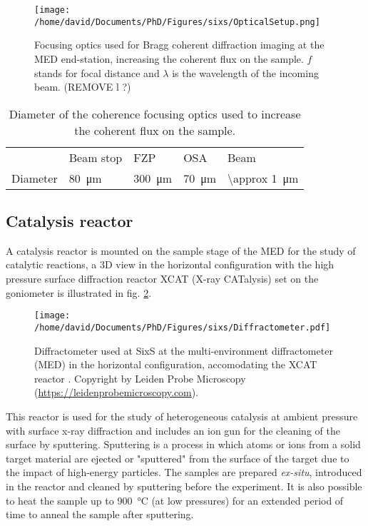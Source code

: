 \begin{figure}[!htb]
    \centering
    \texttt{[image: /home/david/Documents/PhD/Figures/sixs/OpticalSetup.png]}
    \caption{
    	Focusing optics used for Bragg coherent diffraction imaging at the MED end-station, increasing the coherent flux on the sample.
        $f$ stands for focal distance and $\lambda$ is the wavelength of the incoming beam. (REMOVE l ?)
    }
    \label{fig:OpticalSetup}
\end{figure}

\begin{table}[!htb]
    \centering
	\begin{tabular}{l|l|l|l|l}
	     & Beam stop & FZP & OSA & Beam\\ \hfill
	    Diameter & \qty{80}{\um} & \qty{300}{\um} & \qty{70}{\um} & \qty{\approx 1}{\um}\\
	\end{tabular}
	\caption{
	Diameter of the coherence focusing optics used to increase the coherent flux on the sample.
	}
    \label{tab:OpticsBCDI}
\end{table}

\subsection{Catalysis reactor}

A catalysis reactor is mounted on the sample stage of the MED for the study of catalytic reactions, a 3D view in the horizontal configuration with the high pressure surface diffraction reactor XCAT (X-ray CATalysis) set on the goniometer is illustrated in fig. \ref{fig:MEDDiffractometer}.

\begin{figure}[!htb]
    \centering
    \texttt{[image: /home/david/Documents/PhD/Figures/sixs/Diffractometer.pdf]}
    \caption{
    	Diffractometer used at SixS at the multi-environment diffractometer (MED) in the horizontal configuration, accomodating the XCAT reactor \parencite{VanRijn2010}.
    	Copyright by Leiden Probe Microscopy (\url{https://leidenprobemicroscopy.com}).
    }
    \label{fig:MEDDiffractometer}
\end{figure}

This reactor is used for the study of heterogeneous catalysis \parencite{VanRijn2010, Resta2020a} at ambient pressure with surface x-ray diffraction and includes an ion gun for the cleaning of the surface by sputtering.
Sputtering is a process in which atoms or ions from a solid target material are ejected or "sputtered" from the surface of the target due to the impact of high-energy particles.
The samples are prepared \textit{ex-situ}, introduced in the reactor and cleaned by sputtering before the experiment.
It is also possible to heat the sample up to \qty{900}{\degreeCelsius} (at low pressures) for an extended period of time to anneal the sample after sputtering.

